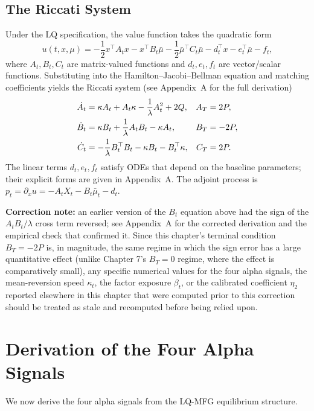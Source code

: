 \subsection{The Riccati System}

Under the LQ specification, the value function takes the quadratic form
\[
    u(t,x,\mu) = -\frac{1}{2}x^\top A_t x - x^\top B_t \bar\mu - \frac{1}{2}
    \bar\mu^\top C_t \bar\mu - d_t^\top x - e_t^\top \bar\mu - f_t,
\]
where $A_t, B_t, C_t$ are matrix-valued functions and $d_t, e_t, f_t$ are
vector/scalar functions. Substituting into the Hamilton--Jacobi--Bellman equation
and matching coefficients yields the Riccati system (see Appendix~A for the full
derivation)
\begin{align}
    \dot{A}_t &= \kappa A_t + A_t \kappa - \frac{1}{\lambda} A_t^2 + 2Q, & A_T &=
        2P, \notag \\
    \dot{B}_t &= \kappa B_t + \frac{1}{\lambda} A_t B_t - \kappa A_t, & B_T &= -2P,
        \label{eq:alpha-riccati-system} \\
    \dot{C}_t &= -\frac{1}{\lambda} B_t^\top B_t - \kappa B_t - B_t^\top \kappa, &
        C_T &= 2P. \notag
\end{align}
The linear terms $d_t, e_t, f_t$ satisfy ODEs that depend on the baseline
parameters; their explicit forms are given in Appendix~A. The adjoint process is
$p_t = \partial_x u = -A_t X_t - B_t \bar\mu_t - d_t$.

\textbf{Correction note:} an earlier version of the $B_t$ equation above had
the sign of the $A_tB_t/\lambda$ cross term reversed; see Appendix~A for the
corrected derivation and the empirical check that confirmed it. Since this
chapter's terminal condition $B_T=-2P$ is, in magnitude, the same regime in
which the sign error has a large quantitative effect (unlike Chapter 7's
$B_T=0$ regime, where the effect is comparatively small), any specific
numerical values for the four alpha signals, the mean-reversion speed
$\kappa_t$, the factor exposure $\beta_t$, or the calibrated coefficient
$\eta_2$ reported elsewhere in this chapter that were computed prior to this
correction should be treated as stale and recomputed before being relied upon.


\section{Derivation of the Four Alpha Signals}
\label{sec:alpha-signals}

We now derive the four alpha signals from the LQ-MFG equilibrium structure.

